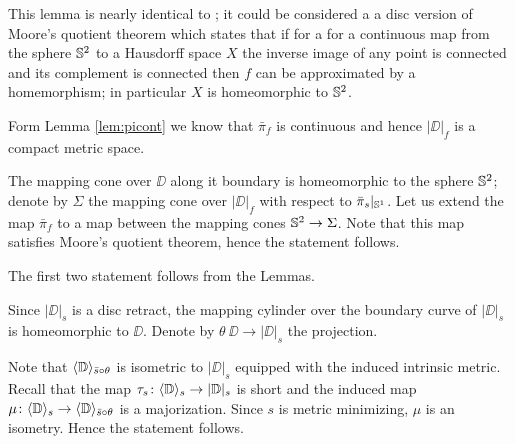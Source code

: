 This lemma is nearly identical to \cite[Corollary 7.12]{LW3}; it could be considered a a disc version of Moore's quotient theorem \cite{moore}
which states that if for a for a continuous map from the sphere $\mathbb{S}^2$ to a Hausdorff space $X$
the inverse image of any point is connected and its complement is connected then $f$ can be approximated by a homemorphism; in particular $X$ is homeomorphic to $\mathbb{S}^2$.

Form Lemma \ref{lem:picont} we know that $\bar\pi_f$ is continuous and hence $|\DD|_f$
is a compact metric space. 


The mapping cone over $\DD$ along it boundary is homeomorphic to the sphere $\mathbb{S}^2$;
denote by $\Sigma$ the mapping cone over $|\DD|_f$ with respect to $\bar\pi_s|_{\mathbb{S}^1}$.
Let us extend the map $\bar\pi_f$ to a map between the mapping cones $\mathbb{S}^2\to\Sigma$.
Note that this map satisfies Moore's quotient theorem, hence the statement follows.
\qeds

The first two statement follows from the Lemmas.

Since $|\DD|_s$ is a disc retract, the mapping cylinder over the boundary curve of $|\DD|_s$ is homeomorphic to $\DD$.
Denote by $\theta\:\DD\to |\DD|_s$ the projection.

Note that $\langle\mathbb{D}\rangle_{\bar s\circ\theta}$ is isometric to $|\DD|_s$ equipped with the induced intrinsic metric.
Recall that the map $\tau_s\colon\langle\mathbb{D}\rangle_s\to|\mathbb{D}|_s$ is short and the induced map $\mu\colon\langle\mathbb{D}\rangle_s\to\langle\mathbb{D}\rangle_{\bar s\circ\theta}$ is a majorization.
Since $s$ is metric minimizing, $\mu$ is an isometry.
Hence the statement follows.
\qeds
